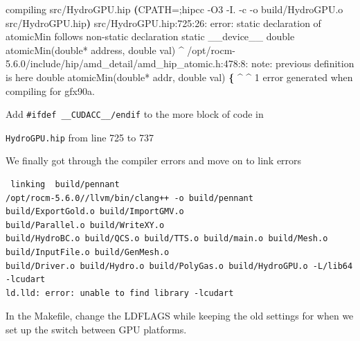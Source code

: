 \documentclass[
]{article}
\let\oldtexttt\texttt
\renewcommand{\texttt}[1]{
  \colorbox{Light}{\oldtexttt{#1}}
}
\newenvironment{Shaded}{}{}
\newcommand{\ExtensionTok}[1]{#1}
\newcommand{\KeywordTok}[1]{\textcolor[rgb]{0.00,0.44,0.13}{\textbf{#1}}}
\newcommand{\NormalTok}[1]{#1}
\newcommand{\StringTok}[1]{\textcolor[rgb]{0.25,0.44,0.63}{#1}}
\newcommand{\VariableTok}[1]{\textcolor[rgb]{0.10,0.09,0.49}{#1}}
\begin{document}
\begin{Shaded}
\begin{Highlighting}[]
\ExtensionTok{compiling}\NormalTok{ src/HydroGPU.hip}
\KeywordTok{(}\VariableTok{CPATH=}\NormalTok{;}\ExtensionTok{hipcc}\NormalTok{ {-}O3 {-}I.  {-}c {-}o build/HydroGPU.o src/HydroGPU.hip}\KeywordTok{)}
\ExtensionTok{src}\NormalTok{/HydroGPU.hip:}\ExtensionTok{725}\NormalTok{:26: error: static declaration of }\StringTok{\textquotesingle{}atomicMin\textquotesingle{}}\NormalTok{ follows non{-}static declaration}
\ExtensionTok{static}\NormalTok{ \_\_device\_\_ double atomicMin(double* address, double val)}
\NormalTok{                         \^{}}
\ExtensionTok{/opt/rocm{-}5.6.0/include/hip/amd\_detail}\NormalTok{/amd\_hip\_atomic.h:}\ExtensionTok{478}\NormalTok{:8: note: previous definition is here}
\ExtensionTok{double}\NormalTok{ atomicMin(double* addr, double val) }\KeywordTok{\{}\NormalTok{                                                                                                                          \^{}}
\NormalTok{       \^{}}
\ExtensionTok{1}\NormalTok{ error generated when compiling for gfx90a.}
\end{Highlighting}
\end{Shaded}

Add \texttt{\#ifdef\ \_\_CUDACC\_\_/endif} to the more block of code in
\texttt{HydroGPU.hip} from line 725 to 737

We finally got through the compiler errors and move on to link errors

\begin{verbatim}
 linking  build/pennant
/opt/rocm-5.6.0//llvm/bin/clang++ -o build/pennant
build/ExportGold.o build/ImportGMV.o
build/Parallel.o build/WriteXY.o 
build/HydroBC.o build/QCS.o build/TTS.o build/main.o build/Mesh.o
build/InputFile.o build/GenMesh.o
build/Driver.o build/Hydro.o build/PolyGas.o build/HydroGPU.o -L/lib64 -lcudart
ld.lld: error: unable to find library -lcudart
\end{verbatim}

In the Makefile, change the LDFLAGS while keeping the old settings for
when we set up the switch between GPU platforms.

\begin{Shaded}
\end{Shaded}
\end{document}
